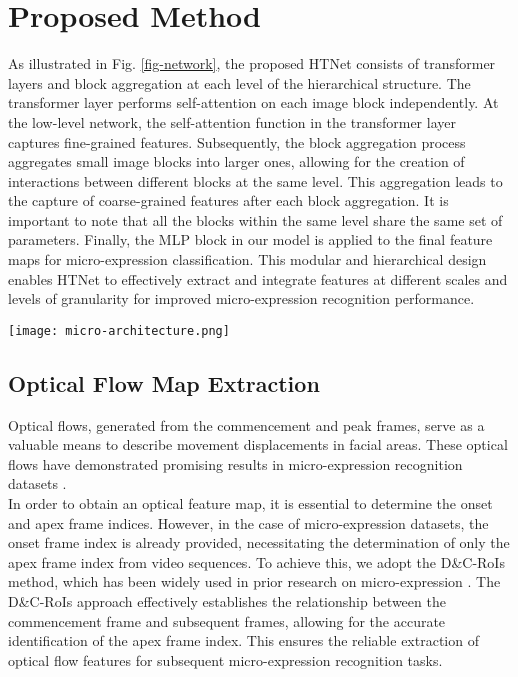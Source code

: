\documentclass[review,12pt, 3p]{elsarticle}
\begin{document}
\section{Proposed Method}
As illustrated in Fig. \ref{fig-network}, the proposed HTNet consists of transformer layers and block aggregation at each level of the hierarchical structure. The transformer layer performs self-attention on each image block independently. At the low-level network, the self-attention function in the transformer layer captures fine-grained features. Subsequently, the block aggregation process aggregates small image blocks into larger ones, allowing for the creation of interactions between different blocks at the same level. This aggregation leads to the capture of coarse-grained features after each block aggregation. It is important to note that all the blocks within the same level share the same set of parameters. Finally, the MLP block in our model is applied to the final feature maps for micro-expression classification. This modular and hierarchical design enables HTNet to effectively extract and integrate features at different scales and levels of granularity for improved micro-expression recognition performance.
\begin{figure*}[t]
\centering
  \texttt{[image: micro-architecture.png]}
  \caption{HTNet: Overall architectures of hierarchical transformer network for micro-expression recognition.  Low-level self-attention in transformer layers captures fine-grained features in local regions. High-level self-attention in transformer layers captures coarse-grained features in global regions. An aggregation block is proposed to create interactions between different blocks at the same level.}
  \label{fig-network}
\end{figure*}
\subsection{Optical Flow Map Extraction}
Optical flows, generated from the commencement and peak frames, serve as a valuable means to describe movement displacements in facial areas. These optical flows have demonstrated promising results in micro-expression recognition datasets \cite{ref-9,ref-5}. \\
In order to obtain an optical feature map, it is essential to determine the onset and apex frame indices. However, in the case of micro-expression datasets, the onset frame index is already provided, necessitating the determination of only the apex frame index from video sequences. To achieve this, we adopt the D\&C-RoIs method, which has been widely used in prior research on micro-expression \cite{ref-9}. The D\&C-RoIs approach effectively establishes the relationship between the commencement frame and subsequent frames, allowing for the accurate identification of the apex frame index. This ensures the reliable extraction of optical flow features for subsequent micro-expression recognition tasks.
\end{document}
